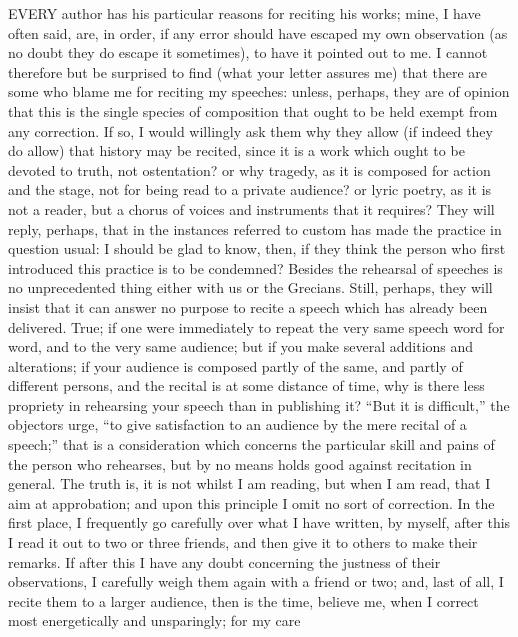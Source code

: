 
EVERY author has his particular reasons for reciting his works; mine, I
have often said, are, in order, if any error should have escaped my own
observation (as no doubt they do escape it sometimes), to have it pointed
out to me. I cannot therefore but be surprised to find (what your letter
assures me) that there are some who blame me for reciting my speeches:
unless, perhaps, they are of opinion that this is the single species of
composition that ought to be held exempt from any correction. If so, I
would willingly ask them why they allow (if indeed they do allow) that
history may be recited, since it is a work which ought to be devoted to
truth, not ostentation? or why tragedy, as it is composed for action and
the stage, not for being read to a private audience? or lyric poetry, as
it is not a reader, but a chorus of voices and instruments that it
requires? They will reply, perhaps, that in the instances referred to
custom has made the practice in question usual: I should be glad to know,
then, if they think the person who first introduced this practice is to be
condemned? Besides the rehearsal of speeches is no unprecedented thing
either with us or the Grecians. Still, perhaps, they will insist that it
can answer no purpose to recite a speech which has already been delivered.
True; if one were immediately to repeat the very same speech word for
word, and to the very same audience; but if you make several additions and
alterations; if your audience is composed partly of the same, and partly
of different persons, and the recital is at some distance of time, why is
there less propriety in rehearsing your speech than in publishing it? ``But
it is difficult,'' the objectors urge, ``to give satisfaction to an audience
by the mere recital of a speech;'' that is a consideration which concerns
the particular skill and pains of the person who rehearses, but by no
means holds good against recitation in general. The truth is, it is not
whilst I am reading, but when I am read, that I aim at approbation; and
upon this principle I omit no sort of correction. In the first place, I
frequently go carefully over what I have written, by myself, after this I
read it out to two or three friends, and then give it to others to make
their remarks. If after this I have any doubt concerning the justness of
their observations, I carefully weigh them again with a friend or two;
and, last of all, I recite them to a larger audience, then is the time,
believe me, when I correct most energetically and unsparingly; for my care
